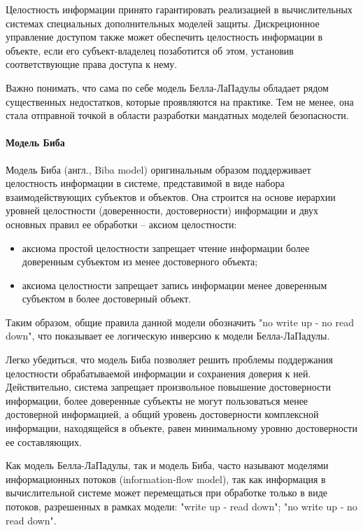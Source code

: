 Целостность информации принято гарантировать реализацией в вычислительных системах специальных дополнительных моделей защиты. Дискреционное управление доступом также может обеспечить целостность информации в объекте, если его субъект-владелец позаботится об этом, установив соответствующие права доступа к нему. 

Важно понимать, что сама по себе модель Белла-ЛаПадулы обладает рядом существенных недостатков,  которые проявляются на практике. Тем не менее, она стала отправной точкой в области разработки мандатных моделей безопасности.

\paragraph{Модель Биба}

Модель Биба (англ., Biba model) оригинальным образом поддерживает целостность информации в системе, представимой в виде набора взаимодействующих субъектов и объектов. Она строится на основе иерархии уровней целостности (доверенности, достоверности) информации и двух основных правил ее обработки -- аксиом целостности: 

\begin{itemize}
	\item аксиома простой целостности запрещает чтение информации более доверенным субъектом из менее достоверного объекта; 
	\item аксиома целостности запрещает запись информации менее доверенным субъектом в более достоверный объект. 
\end{itemize}

Таким образом, общие правила данной модели обозначить "no write up - no read down", что показывает ее логическую инверсию к модели Белла-ЛаПадулы. 

Легко убедиться, что модель Биба позволяет решить проблемы поддержания целостности обрабатываемой информации и сохранения доверия к ней. Действительно, система запрещает произвольное повышение достоверности информации, более доверенные субъекты не могут пользоваться менее достоверной информацией, а общий уровень достоверности комплексной информации, находящейся в объекте, равен минимальному уровню достоверности ее составляющих. 

Как модель Белла-ЛаПадулы, так и модель Биба, часто называют моделями информационных потоков (information-flow model), так как информация в вычислительной системе может перемещаться при обработке только в виде потоков, разрешенных в рамках модели: "write up - read down"; "no write up - no read down". 

